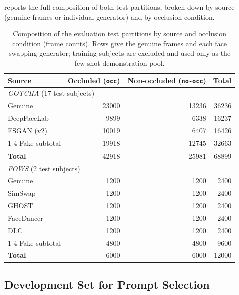  reports the full composition of both test partitions, broken down by source (genuine frames or individual generator) and by occlusion condition.

\begin{table}[t]
	\centering
	\caption{Composition of the evaluation test partitions by source and occlusion condition (frame counts). Rows give the genuine frames and each face swapping generator; training subjects are excluded and used only as the few-shot demonstration pool.}
	\label{tab:datasets}
	\begin{tabular}{lrrr}
		\toprule
		\textbf{Source} & \textbf{Occluded (\texttt{occ})} & \textbf{Non-occluded (\texttt{no-occ})} & \textbf{Total} \\
		\midrule
		\multicolumn{4}{l}{\textit{GOTCHA} (17 test subjects)} \\
		\midrule
		Genuine        & \num{23000} & \num{13236} & \num{36236} \\
		DeepFaceLab    & \num{9899}  & \num{6338}  & \num{16237} \\
		FSGAN (v2)     & \num{10019} & \num{6407}  & \num{16426} \\
		\cmidrule(lr){1-4}
		Fake subtotal  & \num{19918} & \num{12745} & \num{32663} \\
		\textbf{Total} & \num{42918} & \num{25981} & \num{68899} \\
		\midrule
		\multicolumn{4}{l}{\textit{FOWS} (2 test subjects)} \\
		\midrule
		Genuine        & \num{1200} & \num{1200} & \num{2400} \\
		SimSwap        & \num{1200} & \num{1200} & \num{2400} \\
		GHOST          & \num{1200} & \num{1200} & \num{2400} \\
		FaceDancer     & \num{1200} & \num{1200} & \num{2400} \\
		DLC            & \num{1200} & \num{1200} & \num{2400} \\
		\cmidrule(lr){1-4}
		Fake subtotal  & \num{4800} & \num{4800} & \num{9600} \\
		\textbf{Total} & \num{6000} & \num{6000} & \num{12000} \\
		\bottomrule
	\end{tabular}
\end{table}

\subsection{Development Set for Prompt Selection}
\label{subsec:devset}

